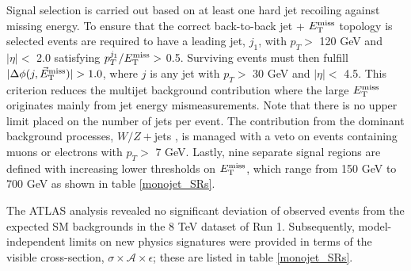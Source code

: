 Signal selection is carried out based on at least one hard jet recoiling against missing energy. To ensure that the correct back-to-back jet + $E_{\mathrm{T}}^{\mathrm{miss}}$ topology is selected events are required to have a leading jet, $j_{1}$, with $p_{T} >$ 120 GeV and $|\eta| <$ 2.0 satisfying $p_{T}^{j_{1}}/E_{\mathrm{T}}^{\mathrm{miss}} >$ 0.5. Surviving events must then fulfill $|\Delta\phi(j,\metvec)|>1.0$, where $j$ is any jet with $p_{T} >$ 30 GeV and $|\eta| <$ 4.5. This criterion reduces the multijet background contribution where the large $E_{\mathrm{T}}^{\mathrm{miss}}$ originates mainly from jet energy mismeasurements. Note that there is no upper limit placed on the number of jets per event. The contribution from the dominant background processes, $W/Z+$jets
, is managed with a veto on events containing muons or electrons with $p_{T}>$ 7 GeV. Lastly, nine separate signal regions are defined with increasing lower thresholds on $E_{\mathrm{T}}^{\mathrm{miss}}$, which range from 150 GeV to 700 GeV as shown in table \ref{monojet_SRs}.

The ATLAS \monojet analysis revealed no significant deviation of observed events from the expected SM backgrounds in the 8 TeV dataset of Run 1. Subsequently, model-independent limits on new physics signatures were provided in terms of the visible cross-section, $\sigma\times\mathcal{A}\times\epsilon$; these are listed in table \ref{monojet_SRs}.

